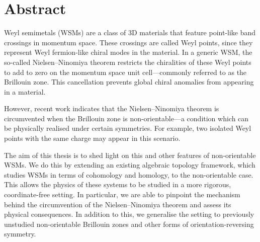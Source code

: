 \chapter*{Abstract}

Weyl semimetals (WSMs) are a class of 3D materials that feature point-like band crossings in momentum space. These crossings are called Weyl points, since they represent Weyl fermion-like chiral modes in the material. In a generic WSM, the so-called Nielsen–Ninomiya theorem restricts the chiralities of these Weyl points to add to zero on the momentum space unit cell—commonly referred to as the Brillouin zone. This cancellation prevents global chiral anomalies from appearing in a material.

However, recent work indicates that the Nielsen–Ninomiya theorem is circumvented when the Brillouin zone is non-orientable—a condition which can be physically realised under certain symmetries. For example, two isolated Weyl points with the same charge may appear in this scenario.

The aim of this thesis is to shed light on this and other features of non-orientable WSMs. We do this by extending an existing algebraic topology framework, which studies WSMs in terms of cohomology and homology, to the non-orientable case. This allows the physics of these systems to be studied in a more rigorous, coordinate-free setting. In particular, we are able to pinpoint the mechanism behind the circumvention of the Nielsen–Ninomiya theorem and assess its physical consequences. In addition to this, we generalise the setting to previously unstudied non-orientable Brillouin zones and other forms of orientation-reversing symmetry.